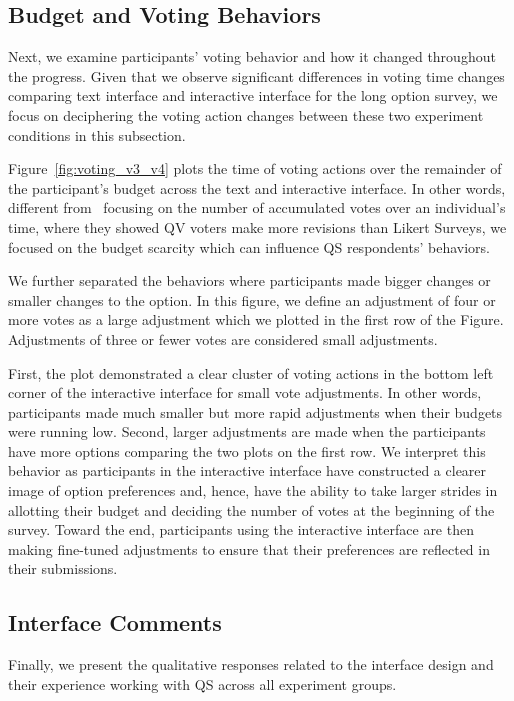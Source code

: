 \subsection{Budget and Voting Behaviors}
Next, we examine participants' voting behavior and how it changed throughout the progress. Given that we observe significant differences in voting time changes comparing text interface and interactive interface for the long option survey, we focus on deciphering the voting action changes between these two experiment conditions in this subsection.

Figure~\ref{fig:voting_v3_v4} plots the time of voting actions over the remainder of the participant's budget across the text and interactive interface. In other words, different from~\textcite{quarfoot2017quadratic} focusing on the number of accumulated votes over an individual's time, where they showed QV voters make more revisions than Likert Surveys, we focused on the budget scarcity which can influence QS respondents' behaviors.

We further separated the behaviors where participants made bigger changes or smaller changes to the option. In this figure, we define an adjustment of four or more votes as a large adjustment which we plotted in the first row of the Figure. Adjustments of three or fewer votes are considered small adjustments.

First, the plot demonstrated a clear cluster of voting actions in the bottom left corner of the interactive interface for small vote adjustments. In other words, participants made much smaller but more rapid adjustments when their budgets were running low. Second, larger adjustments are made when the participants have more options comparing the two plots on the first row. We interpret this behavior as participants in the interactive interface have constructed a clearer image of option preferences and, hence, have the ability to take larger strides in allotting their budget and deciding the number of votes at the beginning of the survey. Toward the end, participants using the interactive interface are then making fine-tuned adjustments to ensure that their preferences are reflected in their submissions.


\subsection{Interface Comments}
Finally, we present the qualitative responses related to the interface design and their experience working with QS across all experiment groups.

